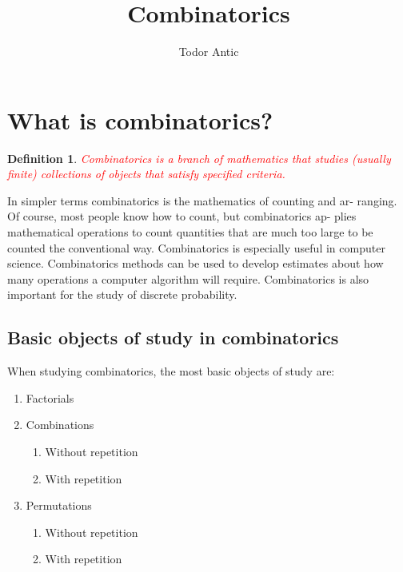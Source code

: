 \documentclass[11pt,a4paper]{article}
\author{Todor Antic}
\title{Combinatorics}
\newtheorem{defn}{Definition}
\begin{document}
	\maketitle
	\tableofcontents
	\newpage
	
	\section{What is combinatorics?}
	\begin{defn}
		\textcolor{red}{Combinatorics is a branch of mathematics that studies (usually finite) collections of objects that satisfy specified criteria.\cite{dic}}
	\end{defn}
	In simpler terms combinatorics is the mathematics of counting and ar-
	ranging. Of course, most people know how to count, but combinatorics ap-
	plies mathematical operations to count quantities that are much too large
	to be counted the conventional way.
	Combinatorics is especially useful in computer science. Combinatorics
	methods can be used to develop estimates about how many operations a
	computer algorithm will require. Combinatorics is also important for the
	study of discrete probability. 
	
	\subsection{Basic objects of study in combinatorics}
	When studying combinatorics, the most basic objects of study are:
	\begin{enumerate}
		\item Factorials
		\item Combinations
			\begin{enumerate}
				\item Without repetition
				\item With repetition 
			\end{enumerate}
		\item Permutations
			\begin{enumerate}
				\item Without repetition
				\item With repetition 
			\end{enumerate}
	\end{enumerate}
\end{document}
